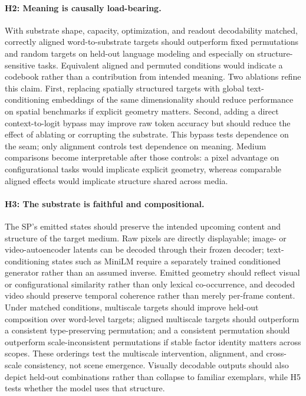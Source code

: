 \documentclass[11pt,a4paper]{article}
\begin{document}
\paragraph{H2: Meaning is causally load-bearing.} With substrate shape, capacity, optimization, and readout decodability matched, correctly aligned word-to-substrate targets should outperform fixed permutations and random targets on held-out language modeling and especially on structure-sensitive tasks. Equivalent aligned and permuted conditions would indicate a codebook rather than a contribution from intended meaning. Two ablations refine this claim. First, replacing spatially structured targets with global text-conditioning embeddings of the same dimensionality should reduce performance on spatial benchmarks if explicit geometry matters. Second, adding a direct context-to-logit bypass may improve raw token accuracy but should reduce the effect of ablating or corrupting the substrate. This bypass tests dependence on the seam; only alignment controls test dependence on meaning. Medium comparisons become interpretable after those controls: a pixel advantage on configurational tasks would implicate explicit geometry, whereas comparable aligned effects would implicate structure shared across media.

\paragraph{H3: The substrate is faithful and compositional.} The SP's emitted states should preserve the intended upcoming content and structure of the target medium. Raw pixels are directly displayable; image- or video-autoencoder latents can be decoded through their frozen decoder; text-conditioning states such as MiniLM require a separately trained conditioned generator rather than an assumed inverse. Emitted geometry should reflect visual or configurational similarity rather than only lexical co-occurrence, and decoded video should preserve temporal coherence rather than merely per-frame content. Under matched conditions, multiscale targets should improve held-out composition over word-level targets; aligned multiscale targets should outperform a consistent type-preserving permutation; and a consistent permutation should outperform scale-inconsistent permutations if stable factor identity matters across scopes. These orderings test the multiscale intervention, alignment, and cross-scale consistency, not scene emergence. Visually decodable outputs should also depict held-out combinations rather than collapse to familiar exemplars, while H5 tests whether the model uses that structure.
\end{document}
